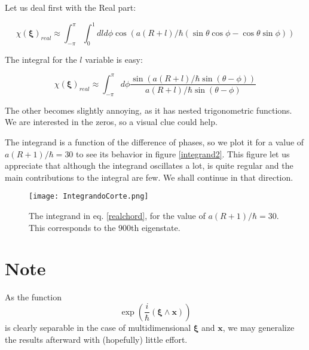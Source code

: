 \documentclass[a4paper,10pt]{article}
\newcommand{\ihb}{\frac{i}{\hbar}}
\newcommand{\xfase}{\mathbf{x}}
\newcommand{\xifase}{ {\boldsymbol{\xi}} }
\begin{document}
Let us deal first with the Real part:

\begin{equation}
\chi(\xifase)_{real}\approx \int_{-\pi}^\pi \int_0^1 dl d\phi
 \cos \left( a(R+l)/\hbar 
(\sin\theta \cos\phi- \cos\theta \sin\phi ) 
\right)
\end{equation}


The integral for the $l$ variable is easy:

\begin{equation}\label{realchord}
\chi(\xifase)_{real}\approx \int_{-\pi}^\pi  d\phi
\frac{ \sin \left( a(R+l)/\hbar \sin (\theta-\phi) 
\right)}
{a(R+l)/\hbar \sin (\theta-\phi)}
\end{equation}

The other becomes slightly annoying, as it has nested
trigonometric functions. We are interested in the zeros,
so a visual clue could help.

The integrand is a function of the difference of phases,
so we plot it for a value of $a(R+1)/\hbar=30$ to see
its behavior in figure \ref{integrand2}.
This figure let us appreciate that although the integrand
oscillates a lot, is quite regular and the main 
contributions to the integral are few. 
We shall continue in that direction.



\begin{figure}
\begin{center}
\texttt{[image: IntegrandoCorte.png]}
\caption{ The integrand in eq. \ref{realchord}, for 
the value of $a(R+1)/\hbar=30$. This corresponds to the
$900$th eigenstate.}\label{integrand02}
\end{center}
\end{figure}



\section{Note}

As the function 
\begin{equation}
 \exp \left( \ihb
(\xifase\wedge\xfase ) \right)
\end{equation}
is clearly separable in the case of multidimensional $\xifase$ and
$\xfase$, we may generalize the results afterward with (hopefully) 
little effort. 



\end{document}
